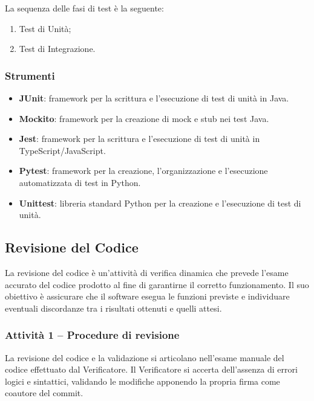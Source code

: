 \documentclass[a4paper, 11pt, oneside]{scrartcl}
\begin{document}
La sequenza delle fasi di test è la seguente:
\begin{enumerate}
    \item Test di Unità;
    \item Test di Integrazione.
\end{enumerate}

\subsubsection{Strumenti}
\begin{itemize}
    \item \textbf{JUnit}: framework per la scrittura e l'esecuzione di test di unità in Java.
    \item \textbf{Mockito}: framework per la creazione di mock e stub nei test Java.
    \item \textbf{Jest}: framework per la scrittura e l'esecuzione di test di unità in TypeScript/JavaScript.
    \item \textbf{Pytest}: framework per la creazione, l'organizzazione e l'esecuzione automatizzata di test in Python.
    \item \textbf{Unittest}: libreria standard Python per la creazione e l'esecuzione di test di unità.
\end{itemize}

\subsection{Revisione del Codice}
\label{sec:revisione_codice}

La revisione del codice è un'attività di verifica dinamica che prevede l'esame accurato del codice prodotto al fine di garantirne il corretto funzionamento. Il suo obiettivo è assicurare che il software{\scriptsize{}} esegua le funzioni previste e individuare eventuali discordanze tra i risultati ottenuti e quelli attesi.

\subsubsection{Attività 1 -- Procedure di revisione}

La revisione del codice e la validazione si articolano nell'esame manuale del codice effettuato dal Verificatore. Il Verificatore si accerta dell'assenza di errori logici e sintattici, validando le modifiche apponendo la propria firma come coautore del commit.
\end{document}
